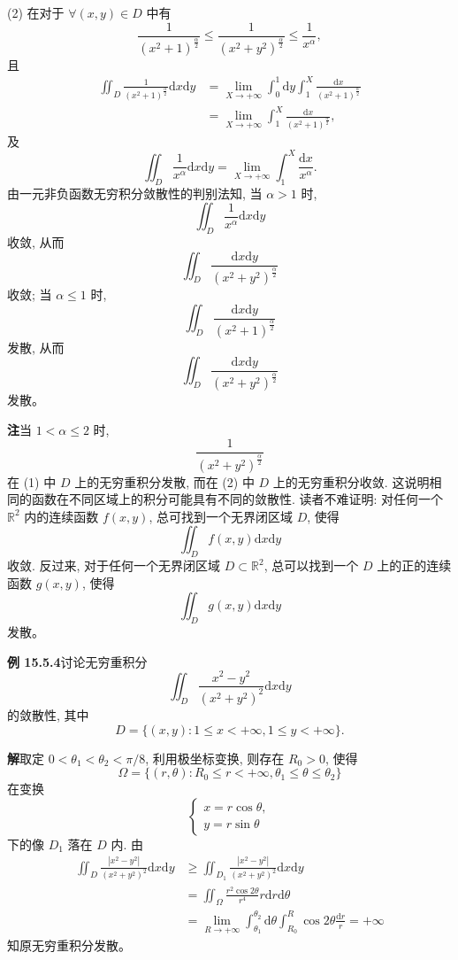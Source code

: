 \documentclass[UTF8, 12pt, fontset=fandol, oneside]{ctexart}
\begin{document}
(2) 在对于 $\forall(x,y)\in D$ 中有
\[
  \frac1{(x^2+1)^{\frac\alpha2}}\leqslant
  \frac1{(x^2+y^2)^{\frac\alpha2}}\leqslant\frac1{x^\alpha},
\]
且
\[
\begin{aligned}
  \iint_D\frac1{(x^2+1)^{\frac\alpha2}}\mathrm dx\mathrm dy
  &=\lim_{X\to+\infty}\int_0^1\mathrm dy\int_1^X
  \frac{\mathrm dx}{(x^2+1)^{\frac\alpha2}}\\
  &=\lim_{X\to+\infty}\int_1^X
  \frac{\mathrm dx}{(x^2+1)^{\frac\alpha2}},
\end{aligned}
\]
及
\[
  \iint_D\frac1{x^\alpha}\mathrm dx\mathrm dy
  =\lim_{X\to+\infty}\int_1^X\frac{\mathrm dx}{x^\alpha}.
\]
由一元非负函数无穷积分敛散性的判别法知, 当 $\alpha>1$ 时,
\[
  \iint_D\frac1{x^\alpha}\mathrm dx\mathrm dy
\]
收敛, 从而
\[
  \iint_D\frac{\mathrm dx\mathrm dy}{(x^2+y^2)^{\frac\alpha2}}
\]
收敛; 当 $\alpha\leqslant1$ 时,
\[
  \iint_D\frac{\mathrm dx\mathrm dy}{(x^2+1)^{\frac\alpha2}}
\]
发散, 从而
\[
  \iint_D\frac{\mathrm dx\mathrm dy}{(x^2+y^2)^{\frac\alpha2}}
\]
发散。

\noindent\textbf{注}\quad 当 $1<\alpha\leqslant2$ 时,
\[
  \frac1{(x^2+y^2)^{\frac\alpha2}}
\]
在 (1) 中 $D$ 上的无穷重积分发散, 而在 (2) 中 $D$ 上的无穷重积分收敛. 这说明相同的函数在不同区域上的积分可能具有不同的敛散性. 读者不难证明: 对任何一个 $\mathbb R^2$ 内的连续函数 $f(x,y)$, 总可找到一个无界闭区域 $D$, 使得
\[
  \iint_D f(x,y)\mathrm dx\mathrm dy
\]
收敛. 反过来, 对于任何一个无界闭区域 $D\subset\mathbb R^2$, 总可以找到一个 $D$ 上的正的连续函数 $g(x,y)$, 使得
\[
  \iint_D g(x,y)\mathrm dx\mathrm dy
\]
发散。

\noindent\textbf{例 15.5.4}\quad 讨论无穷重积分
\[
  \iint_D\frac{x^2-y^2}{(x^2+y^2)^2}\mathrm dx\mathrm dy
\]
的敛散性, 其中
\[
  D=\{(x,y):1\leqslant x<+\infty,1\leqslant y<+\infty\}.
\]

\noindent\textbf{解}\quad 取定 $0<\theta_1<\theta_2<\pi/8$, 利用极坐标变换, 则存在 $R_0>0$, 使得
\[
  \Omega=\{(r,\theta):R_0\leqslant r<+\infty,\theta_1\leqslant\theta\leqslant\theta_2\}
\]
在变换
\[
  \begin{cases}
    x=r\cos\theta,\\
    y=r\sin\theta
  \end{cases}
\]
下的像 $D_1$ 落在 $D$ 内. 由
\[
\begin{aligned}
  \iint_D\frac{|x^2-y^2|}{(x^2+y^2)^2}\mathrm dx\mathrm dy
  &\geqslant\iint_{D_1}\frac{|x^2-y^2|}{(x^2+y^2)^2}\mathrm dx\mathrm dy\\
  &=\iint_\Omega\frac{r^2\cos2\theta}{r^4}r\mathrm dr\mathrm d\theta\\
  &=\lim_{R\to+\infty}\int_{\theta_1}^{\theta_2}\mathrm d\theta
  \int_{R_0}^R\cos2\theta\frac{\mathrm dr}r=+\infty
\end{aligned}
\]
知原无穷重积分发散。
\end{document}
